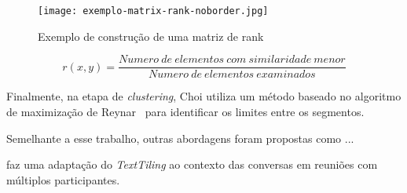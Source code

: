   \begin{figure}[!h]

	\centering
	\texttt{[image: exemplo-matrix-rank-noborder.jpg]}
	\caption{Exemplo de construção de uma matriz de rank}
	\label{fig:exemplomatrixrank}

  \end{figure}




\begin{equation}
r(x,y) = \frac
{Numero\ de\ elementos\ com\ similaridade\ menor}
{Numero\ de\ elementos\ examinados}
\label{equ:ranklocal}
\end{equation}


	
	Finalmente, na etapa de \textit{clustering}, Choi utiliza um método baseado no algoritmo de maximização de Reynar~\cite{reynar} para identificar os limites entre os segmentos.




Semelhante a esse trabalho, outras abordagens foram propostas como ...

\cite{Banerjee2006} faz uma adaptação do \textit{TextTiling} ao contexto das conversas em reuniões com múltiplos participantes.  


